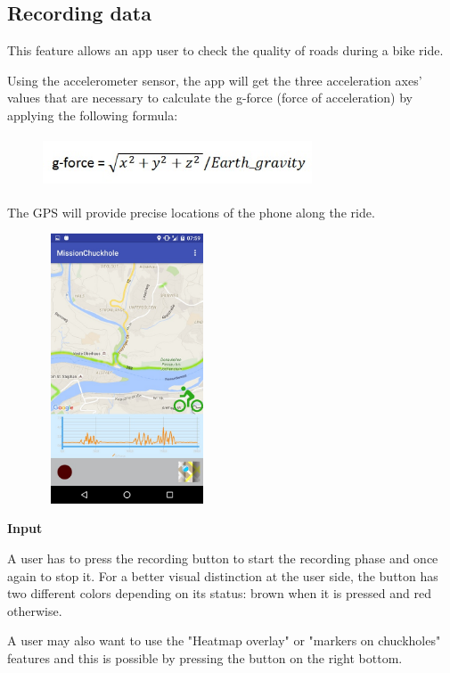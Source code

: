 \documentclass[10pt,a4paper]{article} %
\begin{document}
    
    
    \subsection{ Recording data}
    This feature allows an app user to check the quality of roads during a bike ride.
    
    Using the accelerometer sensor, the app will get the three acceleration axes' values that are necessary to calculate the g-force (force of acceleration) by applying the following formula:
    
   \begin{figure}[H]
	\centering
    \includegraphics[width=8cm, height=1.5cm]{formule}
    \end{figure}
    
    
    The GPS will provide precise locations of the phone along the ride.
    
    
    
    
    \begin{figure}[H]
	\centering
    \includegraphics[width=5cm, height=8cm]{pic2}
    \end{figure}
    
    \textbf{Input}
    
    A user has to press the recording button to start the recording phase and once again to stop it.
    For a better visual distinction at the user side, the button has two different colors depending on its status: brown when it is pressed and red otherwise.
    
    A user may also want to use the "Heatmap overlay" or "markers on chuckholes" features and this is possible by pressing the button on the right bottom.
    
\end{document}
